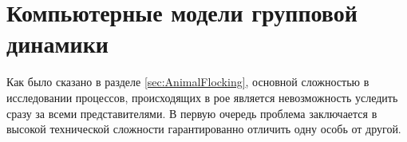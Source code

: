 \section{Компьютерные модели групповой динамики} %
\label{sec:ComputerModelsOfHords}
Как было сказано в разделе \ref{sec:AnimalFlocking}, основной сложностью в исследовании процессов, происходящих в рое является невозможность уследить сразу за всеми представителями. В первую очередь проблема заключается в высокой технической сложности гарантированно отличить одну особь от другой.

